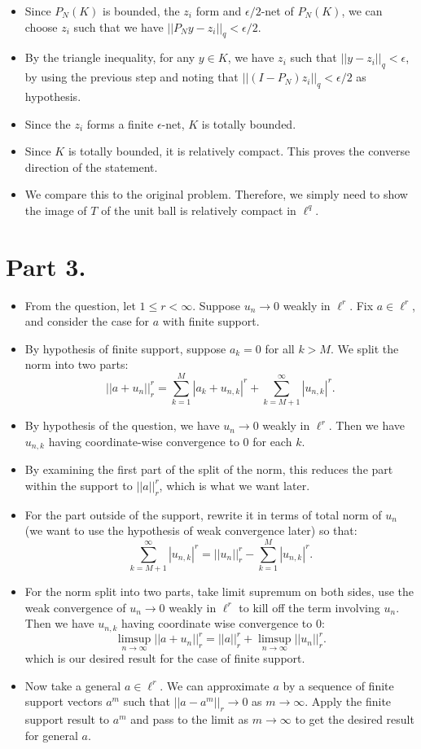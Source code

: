 \documentclass[10pt]{article}
\begin{document}
\begin{itemize}
    \item Since $P_N(K)$ is bounded, the $z_i$ form and $\epsilon/2$-net of $P_N(K)$, we can choose $z_i$ such that we have $||P_N y - z_i||_q < \epsilon/2$.
    \item By the triangle inequality, for any $y \in K$, we have $z_i$ such that $||y - z_i||_q < \epsilon$, by using the previous step and noting that $||(I - P_N)z_i||_q < \epsilon/2$ as hypothesis.
    \item Since the $z_i$ forms a finite $\epsilon$-net, $K$ is totally bounded.
    \item Since $K$ is totally bounded, it is relatively compact. This proves the converse direction of the statement.
    \item We compare this to the original problem. Therefore, we simply need to show the image of $T$ of the unit ball is relatively compact in $\ell^q$.
\end{itemize}

\section*{Part 3.}

\begin{itemize}
    \item From the question, let $1 \leq r < \infty$. Suppose $u_n \to 0$ weakly in $\ell^r$. Fix $a \in \ell^r$, and consider the case for $a$ with finite support.
    \item By hypothesis of finite support, suppose $a_k = 0$ for all $k > M$. We split the norm into two parts:
    \[
       ||a+u_n||^r_r = \sum_{k=1}^M |a_k + u_{n,k}|^r + \sum_{k=M+1}^\infty |u_{n,k}|^r.
    \]
    \item By hypothesis of the question, we have $u_n \to 0$ weakly in $\ell^r$. Then we have $u_{n,k}$ having coordinate-wise convergence to $0$ for each $k$.
    \item By examining the first part of the split of the norm, this reduces the part within the support to $||a||^r_r$, which is what we want later.
    \item For the part outside of the support, rewrite it in terms of total norm of $u_n$ (we want to use the hypothesis of weak convergence later) so that:
    \[
       \sum_{k=M+1}^\infty |u_{n,k}|^r = ||u_n||^r_r - \sum_{k=1}^M |u_{n,k}|^r.
    \]
    \item For the norm split into two parts, take limit supremum on both sides, use the weak convergence of $u_n \to 0$ weakly in $\ell^r$ to kill off the term involving $u_n$. Then we have $u_{n,k}$ having coordinate wise convergence to $0$:
    \[
       \limsup_{n \to \infty} ||a+u_n||^r_r
       = ||a||^r_r + \limsup_{n \to \infty} ||u_n||^r_r.
    \]
    which is our desired result for the case of finite support.
    \item Now take a general $a \in \ell^r$. We can approximate $a$ by a sequence of finite support vectors $a^m$ such that $||a - a^m||_r \to 0$ as $m \to \infty$. Apply the finite support result to $a^m$ and pass to the limit as $m \to \infty$ to get the desired result for general $a$.
\end{itemize}
\end{document}
